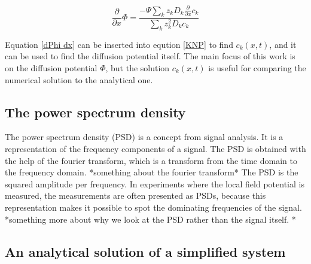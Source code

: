 \documentclass{article}
\begin{document}
\begin{equation}\label{dPhi dx}
\frac{\partial}{\partial x} \Phi = \frac{-\Psi \sum_k z_k D_k \frac{\partial}{\partial x} c_k}{\sum_k z_k^2 D_k c_k}
\end{equation}

Equation \ref{dPhi dx} can be inserted into eqution \ref{KNP} to find $c_k(x,t)$, and it can be used to find the diffusion potential itself. The main focus of this work is on the diffusion potential $\Phi$, but the solution $c_k(x,t)$ is useful for comparing the numerical solution to the analytical one.

\subsection{The power spectrum density}
The power spectrum density (PSD) is a concept from signal analysis. It is a representation of the frequency components of a signal. The PSD is obtained with the help of the fourier transform, which is a transform from the time domain to the frequency domain. *something about the fourier transform* The PSD is the squared amplitude per frequency. In experiments where the local field potential is measured, the measurements are often presented as PSDs, because this representation makes it possible to spot the dominating frequencies of the signal. *something more about why we look at the PSD rather than the signal itself. *
\subsection{An analytical solution of a simplified system}
\end{document}
